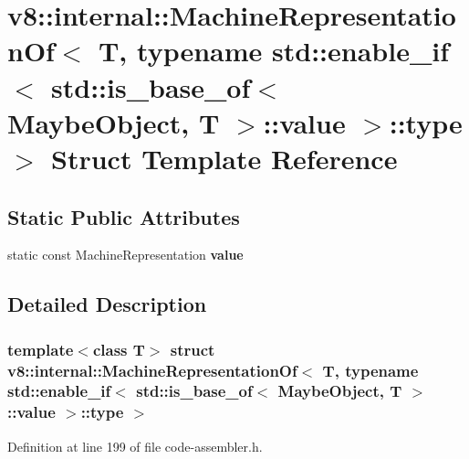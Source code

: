 \hypertarget{structv8_1_1internal_1_1MachineRepresentationOf_3_01T_00_01typename_01std_1_1enable__if_3_01std_22be0fa71299515dd80c0ce22cd21e64}{}\section{v8\+:\+:internal\+:\+:Machine\+Representation\+Of$<$ T, typename std\+:\+:enable\+\_\+if$<$ std\+:\+:is\+\_\+base\+\_\+of$<$ Maybe\+Object, T $>$\+:\+:value $>$\+:\+:type $>$ Struct Template Reference}
\label{structv8_1_1internal_1_1MachineRepresentationOf_3_01T_00_01typename_01std_1_1enable__if_3_01std_22be0fa71299515dd80c0ce22cd21e64}
\subsection*{Static Public Attributes}
\begin{DoxyCompactItemize}
\item 
static const Machine\+Representation {\bfseries value}
\end{DoxyCompactItemize}


\subsection{Detailed Description}
\subsubsection*{template$<$class T$>$\newline
struct v8\+::internal\+::\+Machine\+Representation\+Of$<$ T, typename std\+::enable\+\_\+if$<$ std\+::is\+\_\+base\+\_\+of$<$ Maybe\+Object, T $>$\+::value $>$\+::type $>$}



Definition at line 199 of file code-\/assembler.\+h.



